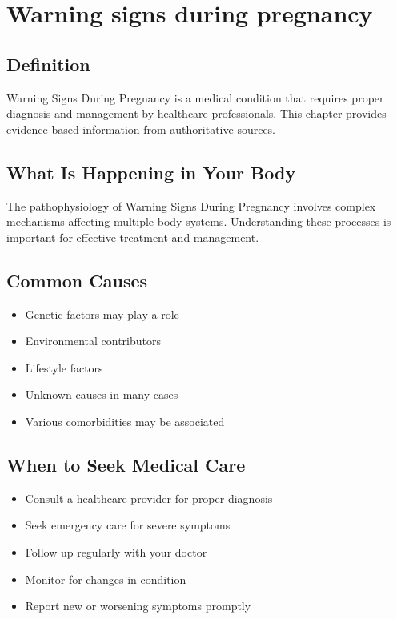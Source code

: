 
\chapter{Warning signs during pregnancy}

\section*{Definition}
Warning Signs During Pregnancy is a medical condition that requires proper diagnosis and management by healthcare professionals. This chapter provides evidence-based information from authoritative sources.

\section*{What Is Happening in Your Body}
The pathophysiology of Warning Signs During Pregnancy involves complex mechanisms affecting multiple body systems. Understanding these processes is important for effective treatment and management.

\section*{Common Causes}
\begin{itemize}
  \item Genetic factors may play a role
  \item Environmental contributors
  \item Lifestyle factors
  \item Unknown causes in many cases
  \item Various comorbidities may be associated
\end{itemize}

\section*{When to Seek Medical Care}
\begin{itemize}
  \item Consult a healthcare provider for proper diagnosis
  \item Seek emergency care for severe symptoms
  \item Follow up regularly with your doctor
  \item Monitor for changes in condition
  \item Report new or worsening symptoms promptly
\end{itemize}

